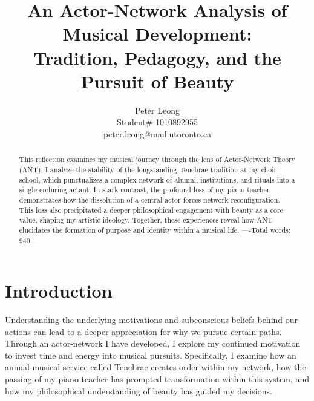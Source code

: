 \documentclass{article} %
\title{An Actor-Network Analysis of Musical Development:\\
Tradition, Pedagogy, and the Pursuit of Beauty}
\author{Peter Leong \\
Student\# 1010892955 \\
peter.leong@mail.utoronto.ca \\
\AND
}
\begin{document}
\vspace{-4ex}

\maketitle

\vspace{-12ex}

\begin{abstract}
This reflection examines my musical journey through the lens of Actor-Network Theory (ANT). 
I analyze the stability of the longstanding Tenebrae tradition at my choir school, which punctualizes a complex network of alumni, institutions, and rituals into a single enduring actant. 
In stark contrast, the profound loss of my piano teacher demonstrates how the dissolution of a central actor forces network reconfiguration. 
This loss also precipitated a deeper philosophical engagement with beauty as a core value, shaping my artistic ideology. 
Together, these experiences reveal how ANT elucidates the formation of purpose and identity within a musical life.
----Total words: 940
\end{abstract}

\vspace{-2ex}


\section{Introduction}

Understanding the underlying motivations and subconscious beliefs behind our actions can lead to a deeper appreciation for why we pursue certain paths. 
Through an actor-network I have developed, I explore my continued motivation to invest time and energy into musical pursuits. 
Specifically, I examine how an annual musical service called Tenebrae creates order within my network, how the passing of my piano teacher has prompted transformation within this system, and how my philosophical understanding of beauty has guided my decisions.
\end{document}
